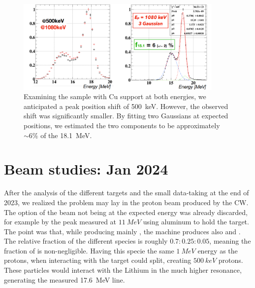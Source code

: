 \begin{refsection}
    \begin{figure}
        \centering%
        \includegraphics[width = 0.9\textwidth]{Figures/X17/Dec2023/X172023_energy_shift.png}
        \caption[X17: Cu support spectra at 500 and 1080 keV]{Examining the sample with Cu support at both energies, we anticipated a peak position shift of \SI{500}{keV}. However, the observed shift was significantly smaller. By fitting two Gaussians at expected positions, we estimated the two components to be approximately $\sim6\%$ of the \SI{18.1}{MeV}.
}
        \label{fig:X17:2023:Cu:shift}
    \end{figure}

    \section{Beam studies: Jan 2024}
    \label{sec:X17:H2+}
        After the analysis of the different targets and the small data-taking at the end of 2023, we realized the problem may lay in the proton beam produced by the CW.
        The option of the beam not being at the expected energy was already discarded, for example by the peak measured at $\SI{11}{MeV}$ using aluminum to hold the target.
        The point was that, while producing mainly , the machine produces also  and .
        The relative fraction of the different species is roughly $0.7:0.25:0.05$, meaning the fraction of  is non-negligible.
        Having this specie the same $\SI{1}{MeV}$ energy as the protons, when interacting with the target could split, creating  $\SI{500}{keV}$ protons.
        These particles would interact with the Lithium in the much higher resonance, generating the measured \SI{17.6}{MeV} line. 
    

\end{refsection}
